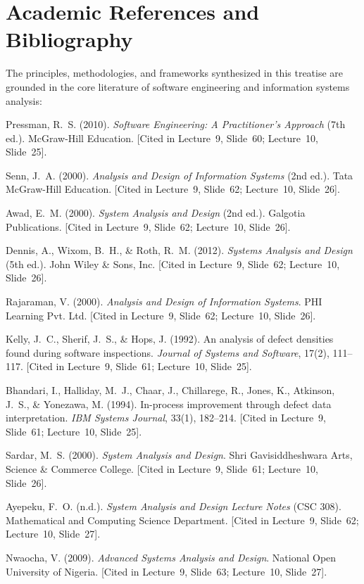 \documentclass[11pt,a4paper]{article}
\begin{document}
\section{Academic References and Bibliography}
\label{sec:references}

The principles, methodologies, and frameworks synthesized in this treatise are grounded in the core literature of software engineering and information systems analysis:

\begin{enumerate}[label={[\arabic*]}]
    \item Pressman, R.~S. (2010). \textit{Software Engineering: A Practitioner's Approach} (7th ed.). McGraw-Hill Education. [Cited in Lecture~9, Slide~60; Lecture~10, Slide~25].
    \item Senn, J.~A. (2000). \textit{Analysis and Design of Information Systems} (2nd ed.). Tata McGraw-Hill Education. [Cited in Lecture~9, Slide~62; Lecture~10, Slide~26].
    \item Awad, E.~M. (2000). \textit{System Analysis and Design} (2nd ed.). Galgotia Publications. [Cited in Lecture~9, Slide~62; Lecture~10, Slide~26].
    \item Dennis, A., Wixom, B.~H., \& Roth, R.~M. (2012). \textit{Systems Analysis and Design} (5th ed.). John Wiley \& Sons, Inc. [Cited in Lecture~9, Slide~62; Lecture~10, Slide~26].
    \item Rajaraman, V. (2000). \textit{Analysis and Design of Information Systems}. PHI Learning Pvt. Ltd. [Cited in Lecture~9, Slide~62; Lecture~10, Slide~26].
    \item Kelly, J.~C., Sherif, J.~S., \& Hops, J. (1992). An analysis of defect densities found during software inspections. \textit{Journal of Systems and Software}, 17(2), 111--117. [Cited in Lecture~9, Slide~61; Lecture~10, Slide~25].
    \item Bhandari, I., Halliday, M.~J., Chaar, J., Chillarege, R., Jones, K., Atkinson, J.~S., \& Yonezawa, M. (1994). In-process improvement through defect data interpretation. \textit{IBM Systems Journal}, 33(1), 182--214. [Cited in Lecture~9, Slide~61; Lecture~10, Slide~25].
    \item Sardar, M.~S. (2000). \textit{System Analysis and Design}. Shri Gavisiddheshwara Arts, Science \& Commerce College. [Cited in Lecture~9, Slide~61; Lecture~10, Slide~26].
    \item Ayepeku, F.~O. (n.d.). \textit{System Analysis and Design Lecture Notes} (CSC 308). Mathematical and Computing Science Department. [Cited in Lecture~9, Slide~62; Lecture~10, Slide~27].
    \item Nwaocha, V. (2009). \textit{Advanced Systems Analysis and Design}. National Open University of Nigeria. [Cited in Lecture~9, Slide~63; Lecture~10, Slide~27].
\end{enumerate}
\end{document}
